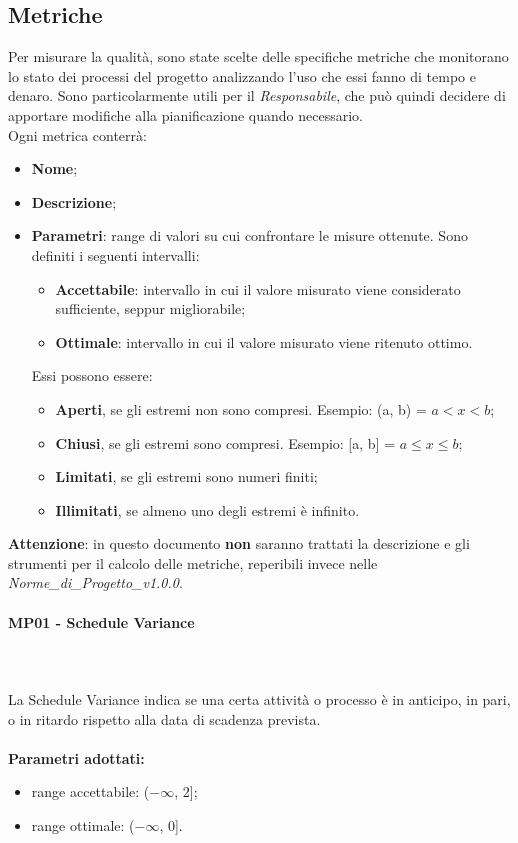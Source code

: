 \subsection{Metriche}
Per misurare la qualità, sono state scelte delle specifiche metriche che monitorano lo stato dei processi del progetto analizzando l’uso che essi fanno di tempo e denaro. Sono particolarmente utili per il \textit{Responsabile}, che può quindi decidere di apportare modifiche alla pianificazione quando necessario.\\
Ogni metrica conterrà:
\begin{itemize}
\item \textbf{Nome};
\item \textbf{Descrizione};
\item \textbf{Parametri}: range di valori su cui confrontare le misure ottenute. Sono definiti i seguenti intervalli: \begin{itemize}
\item \textbf{Accettabile}: intervallo in cui il valore misurato viene considerato sufficiente, seppur migliorabile;
\item \textbf{Ottimale}: intervallo in cui il valore misurato viene ritenuto ottimo.
\end{itemize}
Essi possono essere: \begin{itemize}
\item \textbf{Aperti}, se gli estremi non sono compresi. Esempio: (a, b) = $a < x < b$; 
\item \textbf{Chiusi}, se gli estremi sono compresi. Esempio: [a, b] = $a \leq x \leq b$;
\item \textbf{Limitati}, se gli estremi sono numeri finiti;
\item \textbf{Illimitati}, se almeno uno degli estremi è infinito.
\end{itemize}
\end{itemize}
\textbf{Attenzione}: in questo documento \textbf{non} saranno trattati la descrizione e gli strumenti per il calcolo delle metriche, reperibili invece nelle \textit{Norme\_di\_Progetto\_v1.0.0}.

\paragraph{MP01 - Schedule Variance} \mbox{} \\ \mbox{} \\
La Schedule Variance indica se una certa attività o processo è in anticipo, in pari, o in ritardo rispetto alla data di scadenza prevista. \\ \\ 
\textbf{Parametri adottati:} 
\begin{itemize}
\item range accettabile: ($ -\infty $, 2];
\item range ottimale: ($ -\infty $, 0].
\end{itemize}

